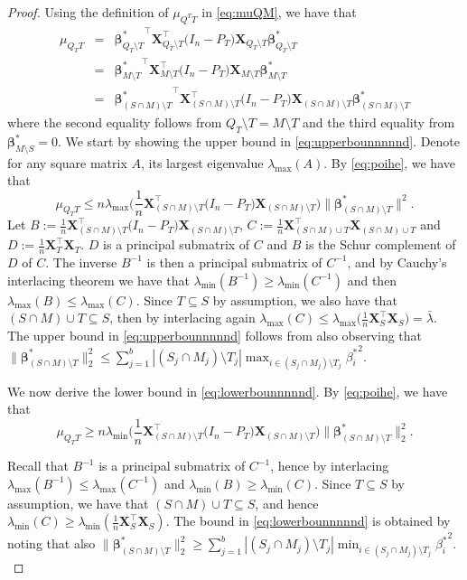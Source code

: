 \documentclass[bj,authoryear]{imsart}
\theoremstyle{plain}
\newcommand{\bs}{\boldsymbol}
\begin{document}
\begin{proof}
Using the definition of $\mu_{Q^T T}$ in \eqref{eq:muQM}, we have that 
\begin{eqnarray}
    \mu_{Q_TT}&=&{\bs \beta^*_{Q_T\setminus T}}^{\top}\bs X_{Q_T\setminus T}^{\top}  \big(I_n-P_T\big) \bs X_{Q_T\setminus T} \bs \beta^*_{Q_T\setminus T}\nonumber\\
    &=&{\bs \beta^*_{M\setminus T}}^{\top}\bs X_{M\setminus T}^{\top}  \big(I_n-P_T\big) \bs X_{M\setminus T} \bs \beta^*_{M\setminus T}\nonumber\\
    &=&{\bs \beta^*_{(S\cap M)\setminus T}}^{\top}\bs X_{(S\cap M)\setminus T}^{\top}  \big(I_n-P_T\big) \bs X_{(S\cap M)\setminus T} \bs \beta^*_{(S\cap M)\setminus T}\label{eq:poihe}
\end{eqnarray}
where the second equality follows from $Q_T\setminus T =M\setminus T $ and the third equality from $\bs \beta^*_{M\setminus S}=0$.
We start by showing the upper bound in \eqref{eq:upperbounnnnnd}. Denote for any square matrix $A$, its largest eigenvalue 
$\lambda_{\max}(A)$. By \eqref{eq:poihe}, we have that
$$\mu_{Q_TT}\leq n\lambda_{\max}\Big(\frac{1}{n}\bs X_{(S\cap M)\setminus T}^{\top}  \big(I_n-P_T\big) \bs X_{(S\cap M)\setminus T}\Big) \|\bs \beta^*_{(S\cap M)\setminus T}\|^2.$$
Let $B:=\tfrac{1}{n}\bs X_{(S\cap M)\setminus T}^{\top}  \big(I_n-P_T\big) \bs X_{(S\cap M)\setminus T}$, $C:=\tfrac{1}{n}\bs X_{(S\cap M)\cup T}^{\top}\bs X_{(S\cap M)\cup T}$ and $D:=\tfrac{1}{n}\bs X_T^{\top} \bs X_T$. $D$ is a principal submatrix of $C$ and $B$ is the Schur complement of $D$ of $C$. The inverse $B^{-1}$ is then a principal submatrix of $C^{-1}$, and by Cauchy's interlacing theorem we have that   $\lambda_{\min}(B^{-1})\geq \lambda_{\min}(C^{-1})$ and then $\lambda_{\max}(B)\leq \lambda_{\max}(C)$. Since $T \subseteq S$ by assumption, we also have that $(S\cap M)\cup T \subseteq S$, then by interlacing again $\lambda_{\max}(C)\leq \lambda_{\max}\Big(\tfrac{1}{n}\bs X_S^{\top}\bs X_S\Big)=\bar{\lambda}$. The upper bound in \eqref{eq:upperbounnnnnd} follows from also observing that $\|\bs \beta^*_{(S\cap M)\setminus T}\|_2^2\leq \sum_{j=1}^b |(S_j\cap M_j)\setminus T_j|\max_{i\in (S_j\cap M_j)\setminus T_j}{\beta_i^*}^2$.

We now derive the lower bound in \eqref{eq:lowerbounnnnnd}. By \eqref{eq:poihe}, we have that %
$$\mu_{Q_TT}\geq n\lambda_{\min}\Big(\frac{1}{n}\bs X_{(S\cap M)\setminus T}^{\top}  \big(I_n-P_T\big) \bs X_{(S\cap M)\setminus T}\Big) \|\bs \beta^*_{(S\cap M)\setminus T}\|_2^2.$$

Recall that $B^{-1}$ is a principal submatrix of $C^{-1}$, hence by interlacing $\lambda_{\max}(B^{-1})\leq \lambda_{\max}(C^{-1})$ and $\lambda_{\min}(B)\geq \lambda_{\min}(C)$. Since $T \subseteq S$ by assumption, we have that $(S\cap M)\cup T \subseteq S$, and hence $\lambda_{\min}(C)\geq\lambda_{\min}(\frac{1}{n}\bs X_S^{\top} \bs X_S)$.
The bound in \eqref{eq:lowerbounnnnnd} is obtained by noting that also $\|\bs \beta^*_{(S\cap M)\setminus T}\|_2^2\geq \sum_{j=1}^b |(S_j\cap M_j)\setminus T_j|\min_{i\in (S_j\cap M_j)\setminus T_j}{\beta_i^*}^2.$
\end{proof}
\end{document}
